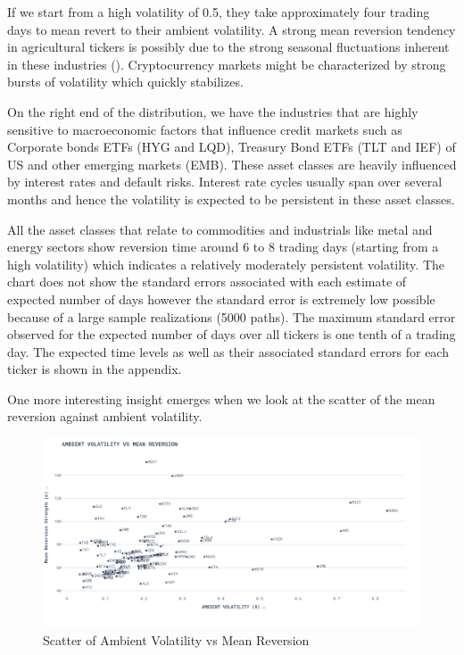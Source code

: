 If we start from a high volatility of 0.5, they take approximately four trading days to mean revert to their ambient volatility. A strong mean reversion tendency in agricultural tickers  is possibly due to the strong seasonal fluctuations inherent in these industries (\cite{Sorensen1999}). Cryptocurrency markets might be characterized by strong bursts of volatility which quickly stabilizes.

On the right end of the distribution, we have the industries that are highly sensitive to macroeconomic factors that influence credit markets such as Corporate bonds ETFs (HYG and LQD), Treasury Bond ETFs (TLT and IEF) of US and other emerging markets (EMB). These asset classes are heavily influenced by interest rates and default risks. Interest rate cycles usually span over several months and hence the volatility is expected to be persistent in these asset classes.

All the asset classes that relate to commodities and industrials like metal and energy sectors show reversion time around 6 to 8 trading days (starting from a high volatility) which indicates a relatively moderately persistent volatility.  The chart does not show the standard errors associated with each estimate of expected number of days however the standard error is extremely low possible because of a large sample realizations (5000 paths). The maximum standard error observed for the expected number of days over all tickers is one tenth of a trading day. The expected time levels as well as their associated standard errors for each ticker is shown in the appendix.

One more interesting insight emerges when we look at the scatter of the mean reversion against ambient volatility. 

\begin{figure}[H]
    \centering
    \includegraphics[width=\textwidth]{images/ambient_volatility_vs_mean_reversion.png}
    \caption{Scatter of Ambient Volatility vs Mean Reversion}
    \label{fig:figure_label}
\end{figure}

